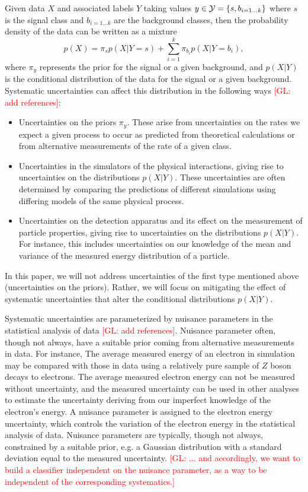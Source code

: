 \documentclass[twocolumn,superscriptaddress,aps]{revtex4-1}
\newcommand{\glnote}[1]{\textcolor{red}{[GL: #1]}}
\theoremstyle{plain}
\begin{document}
Given data $X$ and associated labels $Y$
taking values $y \in {\cal Y} = \{s,
b_{i=1...k} \}$ where $s$ is the signal class and $b_{i=1...k}$ are
the background classes, then the probability density of the data
can be written as a mixture
\begin{equation}
p(X) = \pi_s p(X|Y=s) + \sum_{i=1}^{k} \pi_{b_i} p(X | Y=b_i),
\end{equation}
where $\pi_{y}$ represents the prior for the signal or a given
background, and $p(X|Y)$ is the conditional distribution of the data
for the signal or a given background. Systematic uncertainties can
affect this distribution in the following ways \glnote{add references}:
\begin{itemize}
\item Uncertainties on the priors $\pi_{y}$.  These arise from
  uncertainties on the rates we expect a given process to occur as
  predicted from theoretical calculations or from alternative
  measurements of the rate of a given class.

\item Uncertainties in the simulators of the physical interactions,
  giving rise to uncertainties on the distributions $p(X|Y)$.  These
  uncertainties are often determined by comparing the predictions of
  different simulations using differing models of the same physical
  process.

\item Uncertainties on the detection apparatus and its effect on the
  measurement of particle properties, giving rise to uncertainties on
  the distributions $p(X|Y)$.  For instance, this includes
  uncertainties on our knowledge of the mean and variance of the
  measured energy distribution of a particle.
\end{itemize}
In this paper, we will not address uncertainties of the first type
mentioned above (uncertainties on the priors).  Rather, we will focus
on mitigating the effect of systematic uncertainties that alter the
conditional distributions $p(X|Y)$.

Systematic uncertainties are parameterized by nuisance parameters in the
statistical analysis of data \glnote{add references}.  Nuisance parameter often,
though not always, have a suitable prior coming from alternative measurements in
data.  For instance, The average measured energy of an electron in simulation
may be compared with those in data using a relatively pure sample of $Z$ boson
decays to electrons.  The average measured electron energy can not be measured
without uncertainty, and the measured uncertainty can be used in other analyses
to estimate the uncertainty deriving from our imperfect knowledge of the
electron's energy.  A nuisance parameter is assigned to the electron energy
uncertainty, which controls the variation of the electron energy in the
statistical analysis of data.  Nuisance parameters are typically, though not
always, constrained by a suitable prior, e.g. a Gaussian distribution with a
standard deviation equal to the measured uncertainty. \glnote{... and
accordingly, we want to build a classifier independent on the nuisance
parameter, as a way to be independent of the corresponding systematics.}
\end{document}
